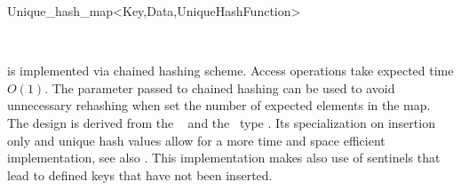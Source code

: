 \begin{ccRefClass}{Unique_hash_map<Key,Data,UniqueHashFunction>}
\vspace*{-5mm}
\ccSeeAlso

\\

\ccImplementation

 is implemented via chained hashing scheme. Access
operations \ccVar\ccc{[i]} take expected time $O(1)$. The 
parameter passed to chained hashing can be used to avoid unnecessary 
rehashing when set the number of expected elements in the map.
The design is derived from the \stl\  and the \leda\ type
. Its specialization on insertion only and unique hash values 
allow for a more time and space efficient implementation, see also
\cite[Chapter 5]{mn-lpcgc-00}. This implementation makes also use
of sentinels that lead to defined keys that have not been inserted.

\end{ccRefClass}





